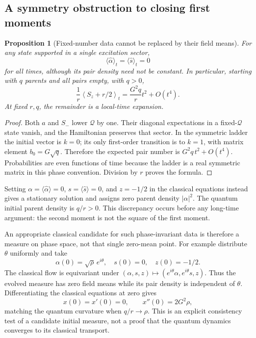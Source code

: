 \documentclass[11pt]{article}
\newtheorem{proposition}[theorem]{Proposition}
\theoremstyle{remark}
\begin{document}
\subsection{A symmetry obstruction to closing first moments}

\begin{proposition}[Fixed-number data cannot be replaced by their field means]
\label{prop:v20v59-phase}
For any state supported in a single excitation sector,
\[
 \langle\widehat\alpha\rangle_t=
       \langle\widehat s\rangle_t=0
\]
for all times, although its pair density need not be constant.
In particular, starting with \(q\) parents and all pairs
empty, with \(q>0\),
\[
 \frac1r\left\langle S_z+r/2\right\rangle_t
               =\frac{G^2q}{r}t^2+O(t^4).
\]
At fixed \(r,q\), the remainder is a local-time expansion.
\end{proposition}
\begin{proof}
Both \(a\) and \(S_-\) lower \(\mathcal Q\) by one.
Their diagonal expectations in a fixed-\(\mathcal Q\)
state vanish, and the Hamiltonian preserves that sector.
In the symmetric ladder the initial vector is \(k=0\);
its only first-order transition is to \(k=1\), with
matrix element \(b_0=G\sqrt q\).  Therefore the expected
pair number is \(G^2q\,t^2+O(t^4)\).  Probabilities are
even functions of time because the ladder is a real
symmetric matrix in this phase convention.  Division by
\(r\) proves the formula.
\end{proof}

Setting \(\alpha=\langle\widehat\alpha\rangle=0\),
\(s=\langle\widehat s\rangle=0\), and \(z=-1/2\) in
the classical equations instead gives a stationary
solution and assigns zero parent density \(|\alpha|^2\).
The quantum initial parent density is \(q/r>0\).
This discrepancy occurs before any long-time argument:
the second moment is not the square of the first moment.

An appropriate classical candidate for such phase-invariant
data is therefore a measure on phase space, not that
single zero-mean point.  For example distribute \(\theta\)
uniformly and take
\[
 \alpha(0)=\sqrt\rho\,e^{i\theta},\quad s(0)=0,\quad z(0)=-1/2.
\]
The classical flow is equivariant under
\((\alpha,s,z)\mapsto(e^{i\theta}\alpha,e^{i\theta}s,z)\).
Thus the evolved measure has zero field means while its
pair density is independent of \(\theta\).  Differentiating
the classical equations at zero gives
\[
 x(0)=x'(0)=0,\qquad x''(0)=2G^2\rho,
\]
matching the quantum curvature when \(q/r\to\rho\).
This is an explicit consistency test of a candidate
initial measure, not a proof that the quantum dynamics
converges to its classical transport.
\end{document}
